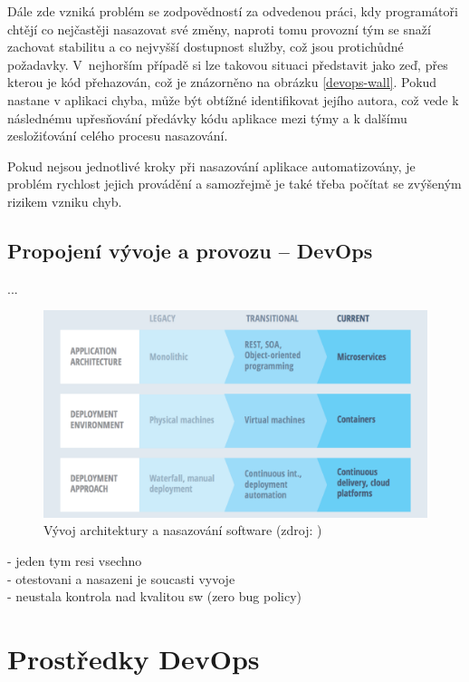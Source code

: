 \documentclass[FM,DP]{tulthesis}
\begin{document}
Dále zde vzniká problém se zodpovědností za odvedenou práci, kdy programátoři chtějí co nejčastěji
nasazovat své změny, naproti tomu provozní tým se snaží zachovat stabilitu a co nejvyšší dostupnost
služby, což jsou protichůdné požadavky. V~nejhorším případě si lze takovou situaci představit 
jako zeď, přes kterou je kód přehazován, což je znázorněno na obrázku \ref{devops-wall}.
Pokud nastane v aplikaci chyba, může být obtížné identifikovat jejího autora, což vede k následnému
upřesňování předávky kódu aplikace mezi týmy a k dalšímu zesložiťování celého procesu nasazování.

Pokud nejsou jednotlivé kroky při nasazování aplikace automatizovány, je problém rychlost jejich provádění
a samozřejmě je také třeba počítat se zvýšeným rizikem vzniku chyb. 

\section{Propojení vývoje a provozu -- DevOps}

...

\begin{figure}[h]
\center
\includegraphics[width=\textwidth]{devops-vs-traditional.png}
\caption{Vývoj architektury a nasazování software (zdroj: \cite[strana~109]{microservices})}
\label{devops-vs-traditional}
\end{figure}

- jeden tym resi vsechno\\
- otestovani a nasazeni je soucasti vyvoje\\
- neustala kontrola nad kvalitou sw (zero bug policy)


\chapter{Prostředky DevOps}
\end{document}
